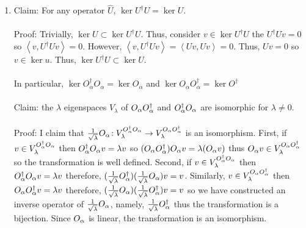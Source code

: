 \documentclass[12pt]{extarticle}
\begin{document}
\begin{enumerate}
\item Claim: For any operator $\hat{U}$, $\ker{U^\dagger U} = \ker{U}$. \\ \\
Proof: Trivially, $\ker{U} \subset \ker{U^\dagger U}$. Thus, consider $v \in \ker{U^\dagger U}$ the $U^\dagger U v = 0$ so $\left<v, U^\dagger U v\right> = 0$. However, $\left<v, U^\dagger U v\right> = \left<Uv, Uv\right> = 0$. Thus, $Uv = 0$ so $v \in \ker{u}$. Thus, $\ker{U^\dagger U} \subset \ker{U}$. \\ \\
In particular, $\ker{O_\alpha^\dagger O_\alpha} = \ker{O_\alpha}$ and $\ker{O_\alpha O_\alpha^\dagger} = \ker{O^\dagger}$ \\ \\
Claim: the $\lambda$ eigenspaces $V_\lambda$ of $O_\alpha O_\alpha^{\dagger}$ and $O_\alpha^{\dagger} O_\alpha$ are isomorphic for $\lambda \neq 0$.\\ \\
Proof: I claim that $\frac{1}{\sqrt{\lambda}} O_\alpha \!: V_\lambda^{O_\alpha^{\dagger} O_\alpha} \rightarrow V_\lambda^{O_\alpha O_\alpha^{\dagger}}$ is an isomorphism. First, if $v \in V_\lambda^{O_\alpha^{\dagger} O_\alpha}$ then $O_\alpha^{\dagger} O_\alpha v = \lambda v$ so $(O_\alpha O_\alpha^{\dagger}) O_\alpha v = \lambda (O_\alpha v)$ thus $O_\alpha v \in V_\lambda^{O_\alpha O_\alpha^{\dagger}}$ so the transformation is well defined. Second, if $v \in V_\lambda^{O_\alpha^{\dagger} O_\alpha}$ then $O_\alpha^{\dagger} O_\alpha v = \lambda v$ therefore, $(\frac{1}{\sqrt{\lambda}} O_\alpha^{\dagger}) (\frac{1}{\sqrt{\lambda}} O_\alpha) v = v$. Similarly, $v \in V_\lambda^{O_\alpha O_\alpha^{\dagger}}$ then $O_\alpha O_\alpha^{\dagger} v = \lambda v$ therefore, $(\frac{1}{\sqrt{\lambda}} O_\alpha) (\frac{1}{\sqrt{\lambda}} O_\alpha^{\dagger}) v = v$ so we have constructed an inverse operator of $\frac{1}{\sqrt{\lambda}} O_\alpha$, namely, $\frac{1}{\sqrt{\lambda}} O_\alpha^{\dagger}$ thus the transformation is a bijection. Since $O_\alpha$ is linear, the transformation is an isomorphism. \\ \\ 

\end{enumerate}
\end{document}
